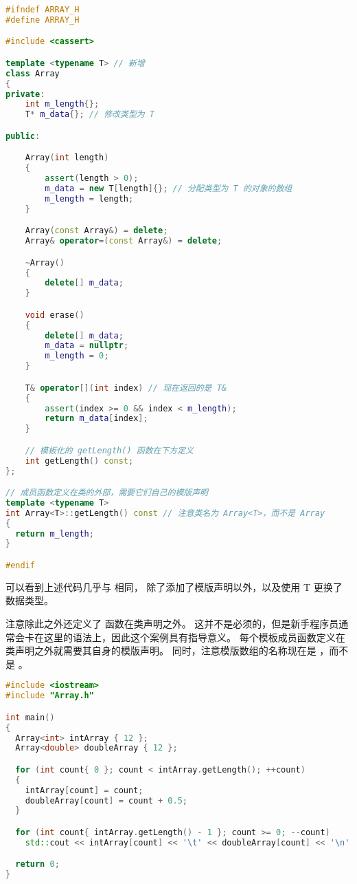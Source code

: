 \documentclass[../../LearnCpp.tex]{subfiles}
\begin{document}
\begin{lstlisting}[language=C++]
#ifndef ARRAY_H
#define ARRAY_H

#include <cassert>

template <typename T> // 新增
class Array
{
private:
    int m_length{};
    T* m_data{}; // 修改类型为 T

public:

    Array(int length)
    {
        assert(length > 0);
        m_data = new T[length]{}; // 分配类型为 T 的对象的数组
        m_length = length;
    }

    Array(const Array&) = delete;
    Array& operator=(const Array&) = delete;

    ~Array()
    {
        delete[] m_data;
    }

    void erase()
    {
        delete[] m_data;
        m_data = nullptr;
        m_length = 0;
    }

    T& operator[](int index) // 现在返回的是 T&
    {
        assert(index >= 0 && index < m_length);
        return m_data[index];
    }

    // 模板化的 getLength() 函数在下方定义
    int getLength() const;
};

// 成员函数定义在类的外部，需要它们自己的模版声明
template <typename T>
int Array<T>::getLength() const // 注意类名为 Array<T>，而不是 Array
{
  return m_length;
}

#endif
\end{lstlisting}

可以看到上述代码几乎与  相同，
除了添加了模版声明以外，以及使用 T 更换了数据类型。

注意除此之外还定义了  函数在类声明之外。
这并不是必须的，但是新手程序员通常会卡在这里的语法上，因此这个案例具有指导意义。
每个模板成员函数定义在类声明之外就需要其自身的模版声明。
同时，注意模版数组的名称现在是 ，而不是 。

\begin{lstlisting}[language=C++]
#include <iostream>
#include "Array.h"

int main()
{
  Array<int> intArray { 12 };
  Array<double> doubleArray { 12 };

  for (int count{ 0 }; count < intArray.getLength(); ++count)
  {
    intArray[count] = count;
    doubleArray[count] = count + 0.5;
  }

  for (int count{ intArray.getLength() - 1 }; count >= 0; --count)
    std::cout << intArray[count] << '\t' << doubleArray[count] << '\n';

  return 0;
}
\end{lstlisting}
\end{document}
